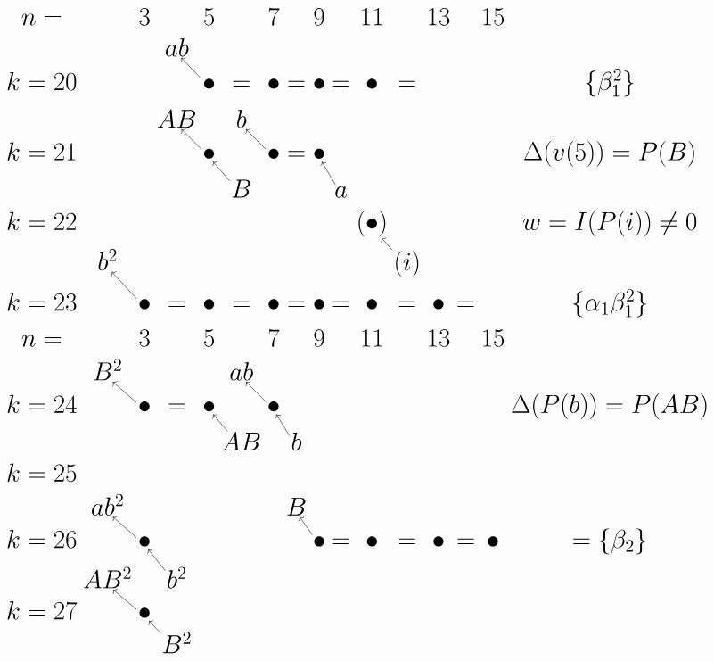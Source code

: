 \documentclass{article}
\begin{document}
\(
\begin{tikzcd}[
nodes={font=\huge,inner sep=1pt},
row sep=0.3cm,
column sep=0.1cm,
column 16/.append style={nodes={align=left,anchor=west}}
]
n= & & 3 & & 5 & & 7 & & 9 & & 11 & & 13 & & 15 & {} \\
& {}  & {}  & ab  & {} & {} \\ 
k=20 & & & & \bullet \arrow[lu] & = & \bullet & = & \bullet & = & \bullet & = & & & & \{\beta_1^2\} \\
& & & AB & & b \\
k=21 & & & & \bullet \arrow[lu] & & \bullet \arrow[lu] & = & \bullet & & & & & & & \Delta(v(5))=P(B)  \\
& & & & & B \arrow[lu] & & & & a \arrow[lu] \\
k=22 & & & & & & & & & & (\bullet) & & & & & w=I(P(i))\ne0  \\
& b^2  & & & & & & & & & & (i) \arrow[lu] \\ 
k=23 & & \bullet \arrow[lu] & = & \bullet & = & \bullet & = & \bullet & = & \bullet & = & \bullet & = & & \{\alpha_1\beta_1^2\} \\
n= & & 3 & & 5 & & 7 & & 9 & & 11 & & 13 & & 15 & {} \\
& B^2 & & & & ab \\
k=24 & & \bullet \arrow[lu] & = & \bullet & & \bullet \arrow[lu] & & & & & & & & & \Delta(P(b))=P(AB) \\
& & & & & AB \arrow[lu] & & b \arrow[lu] \\
k=25 \\
& ab^2 & & & & & & B & & \\ 
k=26 & & \bullet \arrow[lu] & & & & & & \bullet \arrow[lu] & = & \bullet & = & \bullet & = & \bullet & = \{\beta_2\} \\
& AB^2 & & b^2 \arrow[lu] \\
k=27 & & \bullet \arrow[lu] \\
& & & B^2 \arrow[lu] \\
\end{tikzcd}
\)
\end{document}
